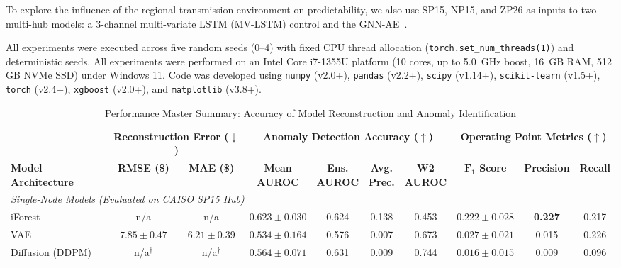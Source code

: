 \documentclass[journal]{IEEEtran}
\begin{document}
To explore the influence of the regional transmission environment on predictability, we also use SP15, NP15, and ZP26 as inputs to two multi-hub models: a 3-channel multi-variate LSTM (MV-LSTM) control and the GNN-AE~\cite{GAT}.

All experiments were executed across five random seeds (0--4) with fixed CPU thread allocation (\texttt{torch.set\_num\_threads(1)}) and deterministic seeds. All experiments were performed on an Intel Core i7-1355U platform (10 cores, up to 5.0\, GHz boost, 16\, GB RAM, 512\, GB NVMe SSD) under Windows 11. Code was developed using \texttt{numpy} (v2.0+), \texttt{pandas} (v2.2+), \texttt{scipy} (v1.14+), \texttt{scikit-learn} (v1.5+), \texttt{torch} (v2.4+), \texttt{xgboost} (v2.0+), and \texttt{matplotlib} (v3.8+).

\begin{table}[!t]
\centering
\caption{Performance Master Summary: Accuracy of Model Reconstruction and Anomaly Identification}
\label{tab:detector_results}
\footnotesize
\renewcommand{\arraystretch}{1.2}
\setlength{\tabcolsep}{3.5pt}
\begin{tabular*}{\textwidth}{@{\extracolsep{\fill}}lccccccccc@{}}
\toprule
& \multicolumn{2}{c}{\textbf{Reconstruction Error ($\downarrow$)}} & \multicolumn{4}{c}{\textbf{Anomaly Detection Accuracy ($\uparrow$)}} & \multicolumn{3}{c}{\textbf{Operating Point Metrics ($\uparrow$)}} \\
\cmidrule(lr){2-3} \cmidrule(lr){4-7} \cmidrule(lr){8-10}
\textbf{Model Architecture} & \textbf{RMSE (\$)} & \textbf{MAE (\$)} & \shortstack{\textbf{Mean}\\\textbf{AUROC}} & \shortstack{\textbf{Ens.}\\\textbf{AUROC}} & \shortstack{\textbf{Avg.}\\\textbf{Prec.}} & \shortstack{\textbf{W2}\\\textbf{AUROC}} & \shortstack{$\boldsymbol{F_1}$\\\textbf{Score}} & \textbf{Precision} & \textbf{Recall} \\
\midrule
\multicolumn{10}{l}{\emph{Single-Node Models (Evaluated on CAISO SP15 Hub)}} \\
 iForest & n/a & n/a & $0.623\pm0.030$ & 0.624 & 0.138 & 0.453 & $\mathbf{0.222\pm0.028}$ & \textbf{0.227} & 0.217 \\
 VAE & $\mathbf{7.85\pm0.47}$ & $\mathbf{6.21\pm0.39}$ & $0.534\pm0.164$ & 0.576 & 0.007 & 0.673 & $0.027\pm0.021$ & 0.015 & 0.226 \\
 Diffusion (DDPM) & n/a$^\dagger$ & n/a$^\dagger$ & $0.564\pm0.071$ & 0.631 & 0.009 & 0.744 & $0.016\pm0.015$ & 0.009 & 0.096 \\

\end{tabular*}
\end{table}
\end{document}
